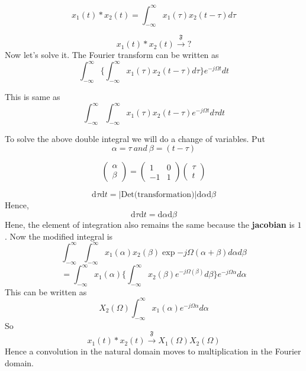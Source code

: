 \begin{equation}
x_1(t)\ast x_2(t) = \int_{-\infty}^{\infty}{x_1(\tau) x_2(t-\tau)}d\tau
\end{equation}

\begin{equation}
x_1(t)\ast x_2(t) \xrightarrow{\mathfrak{F}} {?}
\end{equation}
\noindent
Now let's solve it. The Fourier transform can be written as
\begin{equation}
\int_{-\infty}^{\infty} \{ \int_{-\infty}^{\infty} {x_1(\tau)x_2(t-\tau)} d\tau \} {e^{-j\Omega t}} dt
\end{equation}

This is same as
\begin{equation}
\int_{-\infty}^{\infty}\int_{-\infty}^{\infty} {x_1(\tau)x_2(t-\tau)e^{-j\Omega t}}d\tau dt
\end{equation}

To solve the above double integral we will do a change of variables. Put
\begin{equation}
\alpha =\tau \  and   \ \beta = (t-\tau)
\end{equation}

\begin{equation}
\left( \begin{array}{c}
\alpha \\
\beta \end{array} \right)
=
\left( \begin{array}{cc}
1 & 0 \\
-1 & 1 \end{array} \right)
\left( \begin{array}{c}
\tau \\
 t \end{array} \right)
\end{equation}

\begin{equation}
 \mathrm{d}\tau \mathrm{d}t = |\text{Det(transformation)}| \mathrm{d}\alpha \mathrm{d}\beta
\end{equation}
\noindent
Hence,
\begin{equation}
\mathrm{d}\tau \mathrm{d}t = \mathrm{d}\alpha \mathrm{d}\beta
\end{equation}
Hene, the element of integration also remains the same because the \textbf{jacobian} is $1$.
\noindent
Now the modified integral is
\[
\int_{-\infty}^{\infty}\int_{-\infty}^{\infty} x_1(\alpha)x_2(\beta) \exp{-j\Omega(\alpha+\beta)}d\alpha d\beta
\]
\begin{equation}
=\int_{-\infty}^{\infty} {x_1(\alpha) \{ \int_{-\infty}^{\infty}
{x_2(\beta)e^{-j\Omega(\beta)} d\beta }\} e^{-j\Omega \alpha}d\alpha }
\end{equation}
\noindent
This can be written as
\[
X_2(\Omega) \int_{-\infty}^{\infty} x_1(\alpha) e^{-j\Omega \alpha}d\alpha
\]
So
\begin{equation}
x_1(t)\ast x_2(t) \xrightarrow{\mathfrak{F}} X_1(\Omega)X_2(\Omega)
\end{equation}
\noindent
Hence a convolution in the natural domain moves to multiplication in the Fourier domain.


